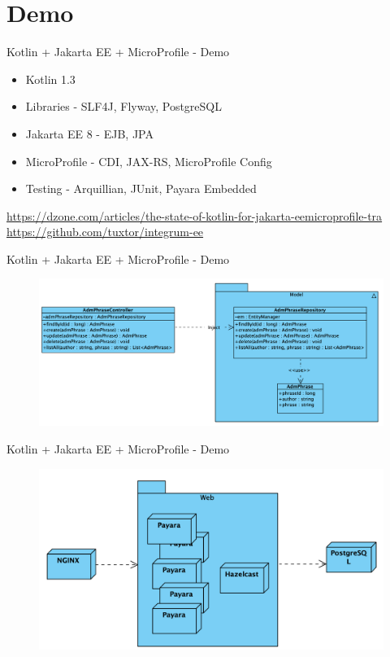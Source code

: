 \documentclass{beamer}
\begin{document}
\section{Demo}
\begin{frame}{Kotlin + Jakarta EE + MicroProfile  - Demo}

\begin{itemize}
	\item Kotlin 1.3
	\item Libraries - SLF4J, Flyway, PostgreSQL
	\item Jakarta EE 8 - EJB, JPA
	\item MicroProfile - CDI, JAX-RS, MicroProfile Config
	\item Testing - Arquillian, JUnit, Payara Embedded
\end{itemize}


\normalsize  \url{https://dzone.com/articles/the-state-of-kotlin-for-jakarta-eemicroprofile-tra}\\
\normalsize  \url{https://github.com/tuxtor/integrum-ee}
\end{frame}

\begin{frame}{Kotlin + Jakarta EE + MicroProfile  - Demo}
\begin{figure}
\centering
\includegraphics[width=\linewidth]{Images/integrum-ee}
\end{figure}
\end{frame}

\begin{frame}{Kotlin + Jakarta EE + MicroProfile  - Demo}
\begin{figure}
\centering
\includegraphics[width=\linewidth]{Images/integrum-deployment}
\end{figure}
\end{frame}
\end{document}
